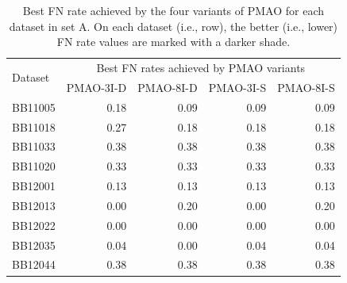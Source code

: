 \documentclass[a4paper,fleqn, review]{cas-dc}
\begin{document}
\begin{table}[!htbp]
	\centering
	\small
	\caption{Best FN rate achieved by the four variants of PMAO for each dataset in set A. On each dataset (i.e., row), the better (i.e., lower) FN rate values are marked with a darker shade.}
	\begin{tabular}{|l|r|r|r|r|}
		\hline
		\multirow{2}{*}{Dataset} & \multicolumn{4}{c|}{Best FN rates achieved by PMAO variants} \\
		\cline{2-5}          & PMAO-3I-D & PMAO-8I-D & PMAO-3I-S & PMAO-8I-S \\
		\hline
		BB11005 & \cellcolor[rgb]{ .988,  1,  .992}0.18 & \cellcolor[rgb]{ .384,  .745,  .478}0.09 & \cellcolor[rgb]{ .384,  .745,  .478}0.09 & \cellcolor[rgb]{ .384,  .745,  .478}0.09 \\
		\hline
		BB11018 & \cellcolor[rgb]{ .988,  1,  .992}0.27 & \cellcolor[rgb]{ .384,  .745,  .478}0.18 & \cellcolor[rgb]{ .384,  .745,  .478}0.18 & \cellcolor[rgb]{ .384,  .745,  .478}0.18 \\
		\hline
		BB11033 & \cellcolor[rgb]{ .988,  1,  .992}0.38 & \cellcolor[rgb]{ .988,  1,  .992}0.38 & \cellcolor[rgb]{ .988,  1,  .992}0.38 & \cellcolor[rgb]{ .988,  1,  .992}0.38 \\
		\hline
		BB11020 & \cellcolor[rgb]{ .988,  1,  .992}0.33 & \cellcolor[rgb]{ .988,  1,  .992}0.33 & \cellcolor[rgb]{ .988,  1,  .992}0.33 & \cellcolor[rgb]{ .988,  1,  .992}0.33 \\
		\hline
		BB12001 & \cellcolor[rgb]{ .988,  1,  .992}0.13 & \cellcolor[rgb]{ .988,  1,  .992}0.13 & \cellcolor[rgb]{ .988,  1,  .992}0.13 & \cellcolor[rgb]{ .988,  1,  .992}0.13 \\
		\hline
		BB12013 & \cellcolor[rgb]{ .384,  .745,  .478}0.00 & \cellcolor[rgb]{ .988,  1,  .992}0.20 & \cellcolor[rgb]{ .384,  .745,  .478}0.00 & \cellcolor[rgb]{ .988,  1,  .992}0.20 \\
		\hline
		BB12022 & \cellcolor[rgb]{ .988,  1,  .992}0.00 & \cellcolor[rgb]{ .988,  1,  .992}0.00 & \cellcolor[rgb]{ .988,  1,  .992}0.00 & \cellcolor[rgb]{ .988,  1,  .992}0.00 \\
		\hline
		BB12035 & \cellcolor[rgb]{ .988,  1,  .992}0.04 & \cellcolor[rgb]{ .384,  .745,  .478}0.00 & \cellcolor[rgb]{ .988,  1,  .992}0.04 & \cellcolor[rgb]{ .988,  1,  .992}0.04 \\
		\hline
		BB12044 & \cellcolor[rgb]{ .988,  1,  .992}0.38 & \cellcolor[rgb]{ .988,  1,  .992}0.38 & \cellcolor[rgb]{ .988,  1,  .992}0.38 & \cellcolor[rgb]{ .988,  1,  .992}0.38 \\

\end{tabular}
\end{table}
\end{document}
